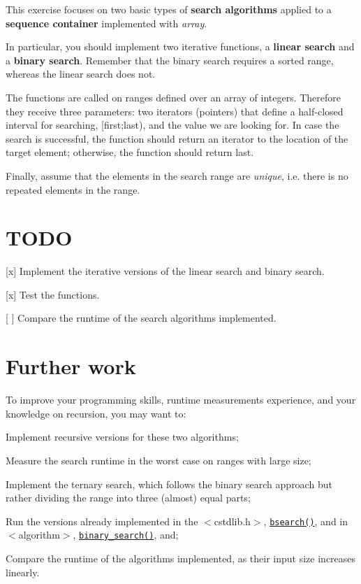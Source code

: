 This exercise focuses on two basic types of {\bfseries{search algorithms}} applied to a {\bfseries{sequence container}} implemented with {\itshape array}.

In particular, you should implement two iterative functions, a {\bfseries{linear search}} and a {\bfseries{binary search}}. Remember that the binary search requires a sorted range, whereas the linear search does not.

The functions are called on ranges defined over an array of integers. Therefore they receive three parameters\+: two iterators (pointers) that define a half-\/closed interval for searching, {\ttfamily \mbox{[}first;last)}, and the {\ttfamily value} we are looking for. In case the search is successful, the function should return an iterator to the location of the target element; otherwise, the function should return {\ttfamily last}.

Finally, assume that the elements in the search range are {\itshape unique}, i.\+e. there is no repeated elements in the range.

\section*{T\+O\+DO}


\begin{DoxyItemize}
\item \mbox{[}x\mbox{]} Implement the iterative versions of the linear search and binary search.
\item \mbox{[}x\mbox{]} Test the functions.
\item \mbox{[} \mbox{]} Compare the runtime of the search algorithms implemented.
\end{DoxyItemize}

\section*{Further work}

To improve your programming skills, runtime measurements experience, and your knowledge on recursion, you may want to\+:


\begin{DoxyEnumerate}
\item Implement recursive versions for these two algorithms;
\item Measure the search runtime in the worst case on ranges with large size;
\item Implement the ternary search, which follows the binary search approach but rather dividing the range into three (almost) equal parts;
\item Run the versions already implemented in the {\ttfamily $<$cstdlib.\+h$>$}, \href{http://en.cppreference.com/w/cpp/algorithm/bsearch}{\texttt{ {\ttfamily bsearch()}}}, and in {\ttfamily $<$algorithm$>$}, \href{http://en.cppreference.com/w/cpp/algorithm/binary_search}{\texttt{ {\ttfamily binary\+\_\+search()}}}, and;
\item Compare the runtime of the algorithms implemented, as their input size increases linearly.
\end{DoxyEnumerate}

